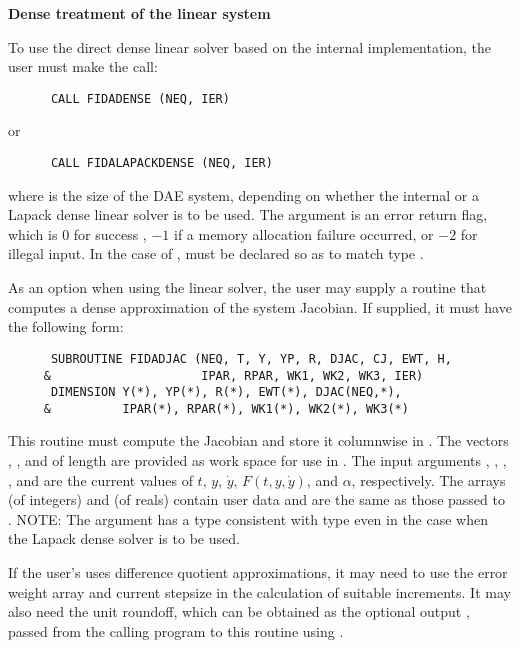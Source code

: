 \begin{Steps}

  {\s} {\bf Dense treatment of the linear system}
  
  To use the direct dense linear solver based on the internal {\ida}
  implementation, the user must make the call:
\begin{verbatim}
      CALL FIDADENSE (NEQ, IER)
\end{verbatim}
  or
\begin{verbatim}
      CALL FIDALAPACKDENSE (NEQ, IER)
\end{verbatim}
  where  is the size of the DAE system, depending on whether the internal
  or a Lapack dense linear solver is to be used.
  The argument  is an error return flag, which is $0$ 
  for success , $-1$ if a memory allocation failure occurred, or $-2$ for illegal input.
  In the case of ,  must be declared so as to match
  {\C} type .

  As an option when using the {\dense} linear solver, the user may supply a
  routine that computes a dense approximation of the system Jacobian. If supplied,
  it must have the following form:
\begin{verbatim}
      SUBROUTINE FIDADJAC (NEQ, T, Y, YP, R, DJAC, CJ, EWT, H,
     &                     IPAR, RPAR, WK1, WK2, WK3, IER)
      DIMENSION Y(*), YP(*), R(*), EWT(*), DJAC(NEQ,*), 
     &          IPAR(*), RPAR(*), WK1(*), WK2(*), WK3(*)
\end{verbatim}
  This routine must compute the Jacobian and store it columnwise in .
  The vectors , , and  of length  are provided
  as work space for use in .
  The input arguments , , , , and  are the
  current values of $t$, $y$, $\dot{y}$, $F(t,y,\dot{y})$, and $\alpha$, respectively.
  The arrays  (of integers) and  (of reals) contain user data
  and are the same as those passed to .
  NOTE: The argument  has a type consistent with {\C} type 
  even in the case when the Lapack dense solver is to be used.

  If the user's  uses difference quotient approximations, it
  may need to use the error weight array  and current stepsize 
  in the calculation of suitable increments.  It may also need the unit
  roundoff, which can be obtained as the optional output ,
  passed from the calling program to this routine using .


\end{Steps}
